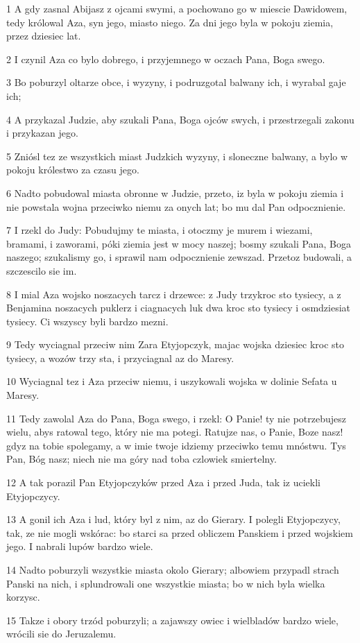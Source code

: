 \par 1 A gdy zasnal Abijasz z ojcami swymi, a pochowano go w miescie Dawidowem, tedy królowal Aza, syn jego, miasto niego. Za dni jego byla w pokoju ziemia, przez dziesiec lat.
\par 2 I czynil Aza co bylo dobrego, i przyjemnego w oczach Pana, Boga swego.
\par 3 Bo poburzyl oltarze obce, i wyzyny, i podruzgotal balwany ich, i wyrabal gaje ich;
\par 4 A przykazal Judzie, aby szukali Pana, Boga ojców swych, i przestrzegali zakonu i przykazan jego.
\par 5 Zniósl tez ze wszystkich miast Judzkich wyzyny, i sloneczne balwany, a bylo w pokoju królestwo za czasu jego.
\par 6 Nadto pobudowal miasta obronne w Judzie, przeto, iz byla w pokoju ziemia i nie powstala wojna przeciwko niemu za onych lat; bo mu dal Pan odpocznienie.
\par 7 I rzekl do Judy: Pobudujmy te miasta, i otoczmy je murem i wiezami, bramami, i zaworami, póki ziemia jest w mocy naszej; bosmy szukali Pana, Boga naszego; szukalismy go, i sprawil nam odpocznienie zewszad. Przetoz budowali, a szczescilo sie im.
\par 8 I mial Aza wojsko noszacych tarcz i drzewce: z Judy trzykroc sto tysiecy, a z Benjamina noszacych puklerz i ciagnacych luk dwa kroc sto tysiecy i osmdziesiat tysiecy. Ci wszyscy byli bardzo mezni.
\par 9 Tedy wyciagnal przeciw nim Zara Etyjopczyk, majac wojska dziesiec kroc sto tysiecy, a wozów trzy sta, i przyciagnal az do Maresy.
\par 10 Wyciagnal tez i Aza przeciw niemu, i uszykowali wojska w dolinie Sefata u Maresy.
\par 11 Tedy zawolal Aza do Pana, Boga swego, i rzekl: O Panie! ty nie potrzebujesz wielu, abys ratowal tego, który nie ma potegi. Ratujze nas, o Panie, Boze nasz! gdyz na tobie spolegamy, a w imie twoje idziemy przeciwko temu mnóstwu. Tys Pan, Bóg nasz; niech nie ma góry nad toba czlowiek smiertelny.
\par 12 A tak porazil Pan Etyjopczyków przed Aza i przed Juda, tak iz uciekli Etyjopczycy.
\par 13 A gonil ich Aza i lud, który byl z nim, az do Gierary. I polegli Etyjopczycy, tak, ze nie mogli wskórac: bo starci sa przed obliczem Panskiem i przed wojskiem jego. I nabrali lupów bardzo wiele.
\par 14 Nadto poburzyli wszystkie miasta okolo Gierary; albowiem przypadl strach Panski na nich, i splundrowali one wszystkie miasta; bo w nich byla wielka korzysc.
\par 15 Takze i obory trzód poburzyli; a zajawszy owiec i wielbladów bardzo wiele, wrócili sie do Jeruzalemu.

